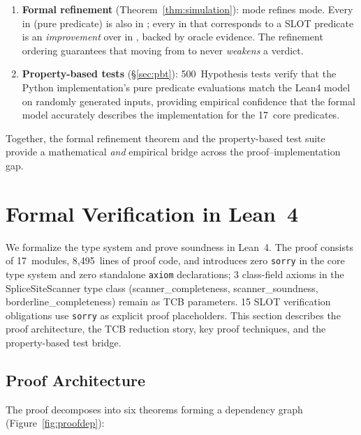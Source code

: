 \begin{enumerate}[leftmargin=*,itemsep=1pt,topsep=2pt]
\item \textbf{Formal refinement} (Theorem~\ref{thm:simulation}):
  \VERIFIED{} mode refines \CONSERVATIVE{} mode.
  Every \PASS{} in \CONSERVATIVE{} (pure predicate) is also \PASS{}
  in \VERIFIED{}; every \PASS{} in \VERIFIED{} that corresponds to a
  SLOT predicate is an \emph{improvement} over \UNCERTAIN{} in
  \CONSERVATIVE{}, backed by oracle evidence.
  The refinement ordering guarantees that moving from
  \CONSERVATIVE{} to \VERIFIED{} never \emph{weakens} a verdict.

\item \textbf{Property-based tests} (\S\ref{sec:pbt}):
  500~Hypothesis tests verify that the Python implementation's pure
  predicate evaluations match the Lean4 model on randomly generated
  inputs, providing empirical confidence that the formal model
  accurately describes the implementation for the 17~core predicates.
\end{enumerate}

Together, the formal refinement theorem and the property-based test
suite provide a mathematical \emph{and} empirical bridge across the
proof--implementation gap.

\section{Formal Verification in Lean~4}\label{sec:proof}

We formalize the type system and prove soundness in Lean~4.
The proof consists of 17~modules, 8{,}495~lines of proof code, and
introduces zero \texttt{sorry} in the core type system and zero standalone
\texttt{axiom} declarations; 3 class-field axioms in the SpliceSiteScanner
type class (scanner\_completeness, scanner\_soundness, borderline\_completeness)
remain as TCB parameters.
15 SLOT verification obligations use \texttt{sorry} as explicit proof placeholders.
This section describes the proof architecture, the TCB reduction story,
key proof techniques, and the property-based test bridge.

\subsection{Proof Architecture}\label{sec:proof-arch}

The proof decomposes into six theorems forming a dependency
graph (Figure~\ref{fig:proofdep}):

